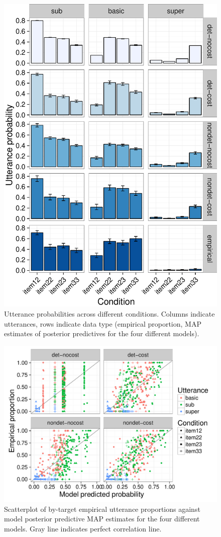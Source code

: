 \documentclass[11pt]{article}
\newcommand{\red}[1]{\textcolor{Red}{#1}}
\begin{document}
\begin{figure}
\centering
\includegraphics[width=.7\textwidth]{pics/qualitativepattern-complete}
\caption{Utterance probabilities across different conditions. Columns indicate utterances, rows indicate data type (empirical proportion, MAP estimates of posterior predictives for the four different models).}
\label{fig:nominalmodelqual}
\end{figure}

\begin{figure}
\centering
\includegraphics[width=.8\textwidth]{pics/scatterplot-complete}
\caption{Scatterplot of by-target empirical utterance proportions against model posterior predictive MAP estimates for the four different models. Gray line indicates perfect correlation line.}
\label{fig:nominalmodelscatt}
\end{figure}




\setlength{\bibleftmargin}{.125in}
\setlength{\bibindent}{-\bibleftmargin}


\end{document}
